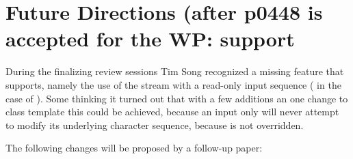 \documentclass[ebook,11pt,article]{memoir}
\begin{document}
\section{Future Directions (after p0448 is accepted for the WP: support }

During the finalizing review sessions Tim Song recognized a missing feature that  supports, namely the use of the stream with a read-only input sequence ( in the case of ). Some thinking it turned out that with a few additions an one change to class template  this could be achieved, because an input only  will never attempt to modify its underlying character sequence, because  is not overridden.

The following changes will be proposed by a follow-up paper:
\end{document}
